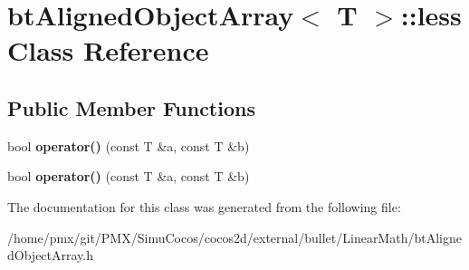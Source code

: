 \hypertarget{classbtAlignedObjectArray_1_1less}{}\section{bt\+Aligned\+Object\+Array$<$ T $>$\+:\+:less Class Reference}
\label{classbtAlignedObjectArray_1_1less}
\subsection*{Public Member Functions}
\begin{DoxyCompactItemize}
\item 
\mbox{\label{classbtAlignedObjectArray_1_1less_a79f471a8270acde691dfb516fd9fe11a}} 
bool {\bfseries operator()} (const T \&a, const T \&b)
\item 
\mbox{\label{classbtAlignedObjectArray_1_1less_a79f471a8270acde691dfb516fd9fe11a}} 
bool {\bfseries operator()} (const T \&a, const T \&b)
\end{DoxyCompactItemize}


The documentation for this class was generated from the following file\+:\begin{DoxyCompactItemize}
\item 
/home/pmx/git/\+P\+M\+X/\+Simu\+Cocos/cocos2d/external/bullet/\+Linear\+Math/bt\+Aligned\+Object\+Array.\+h\end{DoxyCompactItemize}

